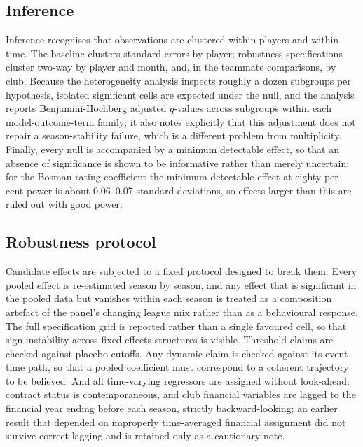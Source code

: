 \documentclass{article}
\begin{document}
\subsection{Inference}
\label{sec:strategy-inference}

Inference recognises that observations are clustered within players and within
time. The baseline clusters standard errors by player; robustness specifications
cluster two-way by player and month, and, in the teammate comparisons, by club.
Because the heterogeneity analysis inspects roughly a dozen subgroups per
hypothesis, isolated significant cells are expected under the null, and the analysis
reports Benjamini-Hochberg adjusted $q$-values across subgroups within each
model-outcome-term family; it also notes explicitly that this adjustment does not
repair a season-stability failure, which is a different problem from multiplicity.
Finally, every null is accompanied by a minimum detectable effect, so that an
absence of significance is shown to be informative rather than merely uncertain:
for the Bosman rating coefficient the minimum detectable effect at eighty per cent
power is about 0.06--0.07 standard deviations, so effects larger than this are ruled
out with good power.

\subsection{Robustness protocol}
\label{sec:strategy-robustness}

Candidate effects are subjected to a fixed protocol designed to break them. Every
pooled effect is re-estimated season by season, and any effect that is significant
in the pooled data but vanishes within each season is treated as a composition
artefact of the panel's changing league mix rather than as a behavioural response.
The full specification grid is reported rather than a single favoured cell, so that
sign instability across fixed-effects structures is visible. Threshold claims are
checked against placebo cutoffs. Any dynamic claim is checked against its event-time
path, so that a pooled coefficient must correspond to a coherent trajectory to be
believed. And all time-varying regressors are assigned without look-ahead: contract
status is contemporaneous, and club financial variables are lagged to the financial
year ending before each season, strictly backward-looking; an earlier result that
depended on improperly time-averaged financial assignment did not survive correct
lagging and is retained only as a cautionary note.
\end{document}

